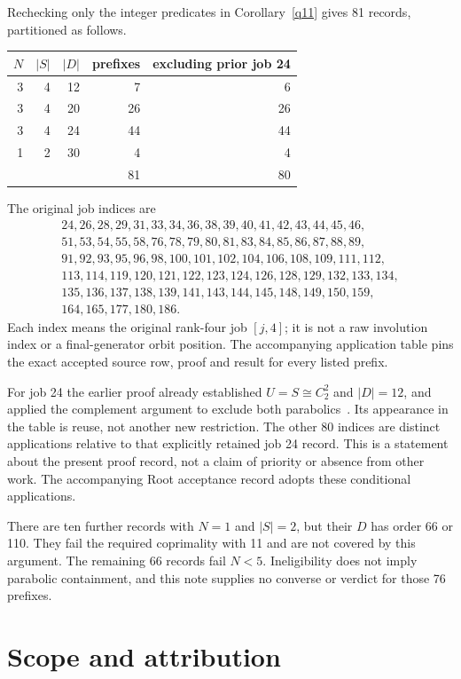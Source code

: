 \documentclass[11pt]{article}
\theoremstyle{remark}\newtheorem{remark}[lemma]{Remark}
\begin{document}
Rechecking only the integer predicates in Corollary~\ref{q11} gives
81 records, partitioned as follows.
\begin{center}
\begin{tabular}{rrrrr}
\toprule
$N$ & $|S|$ & $|D|$ & prefixes & excluding prior job 24\\
\midrule
3&4&12&7&6\\
3&4&20&26&26\\
3&4&24&44&44\\
1&2&30&4&4\\
\midrule
&&&81&80\\
\bottomrule
\end{tabular}
\end{center}
The original job indices are
\begin{gather*}
24,26,28,29,31,33,34,36,38,39,40,41,42,43,44,45,46,\\
51,53,54,55,58,76,78,79,80,81,83,84,85,86,87,88,89,\\
91,92,93,95,96,98,100,101,102,104,106,108,109,111,112,\\
113,114,119,120,121,122,123,124,126,128,129,132,133,134,\\
135,136,137,138,139,141,143,144,145,148,149,150,159,\\
164,165,177,180,186.
\end{gather*}
Each index means the original rank-four job $[j,4]$; it is not a raw
involution index or a final-generator orbit position. The accompanying
application table pins the exact accepted source row, proof and result
for every listed prefix.

For job 24 the earlier proof already established $U=S\cong C_2^2$
and $|D|=12$, and applied the complement argument to exclude both
parabolics~\cite{old,oldcentralizer}. Its appearance in the table is
reuse, not another new restriction. The other 80 indices are distinct
applications relative to that explicitly retained job 24 record.
This is a statement about the present proof record, not a claim of
priority or absence from other work. The accompanying Root acceptance record adopts these conditional applications.

There are ten further records with $N=1$ and $|S|=2$, but their $D$
has order 66 or 110. They fail the required coprimality with 11 and
are not covered by this argument. The remaining 66 records fail
$N<5$. Ineligibility does not imply parabolic containment, and this
note supplies no converse or verdict for those 76 prefixes.

\section{Scope and attribution}
\end{document}
